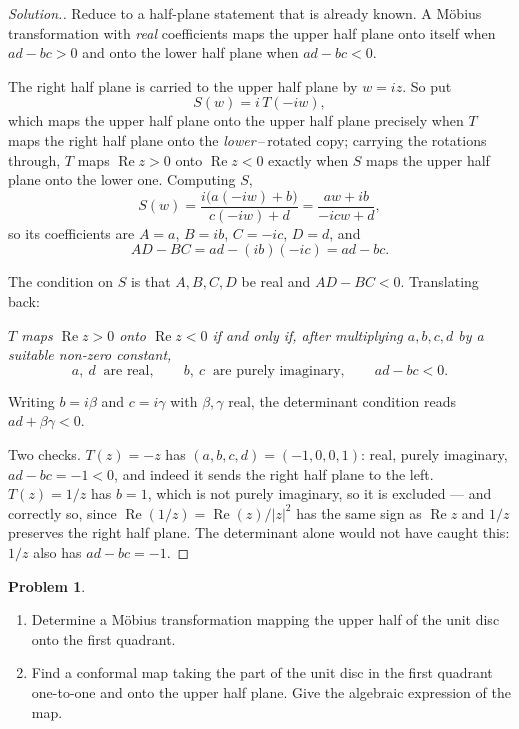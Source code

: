 \documentclass[11pt,a4paper]{article}
\theoremstyle{definition}
\newtheorem{problemx}{Problem}[section]
\newenvironment{problem}{\begin{problemx}}{\end{problemx}}
\newenvironment{solution}
  {\renewcommand{\qedsymbol}{}\begin{proof}[\textit{Solution}.]}
  {\end{proof}}
\begin{document}
\begin{solution}
Reduce to a half-plane statement that is already known. A M\"obius transformation
with \emph{real} coefficients maps the upper half plane onto itself when
$ad - bc > 0$ and onto the lower half plane when $ad - bc < 0$.

The right half plane is carried to the upper half plane by $w = iz$. So put
$$S(w) = i\,T(-iw),$$
which maps the upper half plane onto the upper half plane precisely when $T$ maps
the right half plane onto the \emph{lower}\,--\,rotated copy; carrying the
rotations through, $T$ maps $\operatorname{Re}z > 0$ onto
$\operatorname{Re}z < 0$ exactly when $S$ maps the upper half plane onto the lower
one. Computing $S$,
$$S(w) = \frac{i\big(a(-iw)+b\big)}{c(-iw)+d}
= \frac{aw + ib}{-icw + d},$$
so its coefficients are $A = a$, $B = ib$, $C = -ic$, $D = d$, and
$$AD - BC = ad - (ib)(-ic) = ad - bc .$$

The condition on $S$ is that $A, B, C, D$ be real and $AD - BC < 0$. Translating
back:

\begin{center}
\emph{$T$ maps $\operatorname{Re}z>0$ onto $\operatorname{Re}z<0$ if and only if,
after multiplying $a,b,c,d$ by a suitable non-zero constant,}
$$a,\ d \ \text{ are real},\qquad b,\ c \ \text{ are purely imaginary},
\qquad ad - bc < 0 .$$
\end{center}

Writing $b = i\beta$ and $c = i\gamma$ with $\beta,\gamma$ real, the determinant
condition reads $ad + \beta\gamma < 0$.

Two checks. $T(z) = -z$ has $(a,b,c,d) = (-1,0,0,1)$: real, purely imaginary,
$ad-bc = -1 < 0$, and indeed it sends the right half plane to the left.
$T(z) = 1/z$ has $b = 1$, which is not purely imaginary, so it is excluded --- and
correctly so, since $\operatorname{Re}(1/z) = \operatorname{Re}(z)/\left|z\right|^2$
has the same sign as $\operatorname{Re}z$ and $1/z$ preserves the right half
plane. The determinant alone would not have caught this: $1/z$ also has
$ad - bc = -1$.
\end{solution}


\begin{problem}
\begin{enumerate}
\item[(a).] Determine a M\"obius transformation mapping the upper half of the
unit disc onto the first quadrant.
\item[(b).] Find a conformal map taking the part of the unit disc in the first
quadrant one-to-one and onto the upper half plane. Give the algebraic expression
of the map.
\end{enumerate}
\end{problem}
\end{document}
